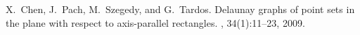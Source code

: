 X.~Chen, J.~Pach, M.~Szegedy, and G.~Tardos.
\newblock Delaunay graphs of point sets in the plane with respect to
  axis-parallel rectangles.
, 34(1):11--23, 2009.
